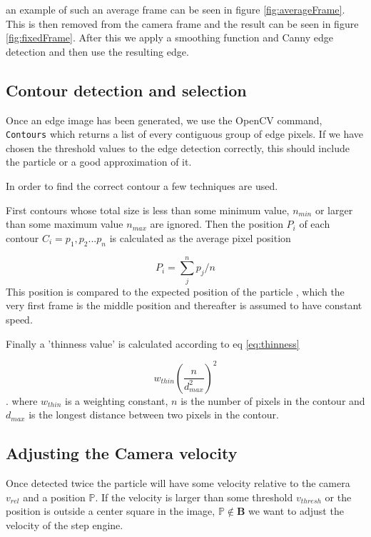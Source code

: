 an example of such an average frame can be seen in figure \ref{fig:averageFrame}. This is then removed from the camera frame and the result can be seen in figure \ref{fig:fixedFrame}. After this we apply a smoothing function and Canny edge detection \cite{Canny} and then use the resulting edge. 

\subsection{Contour detection and selection}

Once an edge image has been generated, we use the OpenCV command, \texttt{Contours} which returns a list of every contiguous group of edge pixels. If we have chosen the threshold values to the edge detection correctly, this should include the particle or a good approximation of it. 

In order to find the correct contour  a few techniques are used.

First contours whose total size is less than some minimum value, $ n_{min}$ or larger than some maximum value $n_{max}$ are ignored. Then the position $P_i$ of each contour $C_i={p_1,p_2...p_n}$ is calculated as the average pixel position

\[
P_i = \sum_{j}^n p_j/n
\]
This position is compared to the expected position of the particle , which the very first frame is the middle position and thereafter is assumed to have constant speed. 

Finally a 'thinness value' is calculated according to eq \ref{eq:thinness}

\begin{equation}\label{eq:thinness}
w_{thin}\left(\frac{ n}{d_{max}^2}\right)^2
\end{equation}. 
where $w_{thin}$ is a weighting constant, $n$ is the number of pixels in the contour and $d_{max}$ is the longest distance between two pixels in the contour.

\subsection{Adjusting the Camera velocity}
Once detected twice the particle will have some velocity relative to the camera $v_{rel}$ and a position $\mathbb{P}$. 
If the velocity is larger than some threshold $v_{thresh}$ or the position is outside a center square in the image, $\mathbb{P} \not \in \mathbf{B}$ we want to adjust the velocity of the step engine. 

